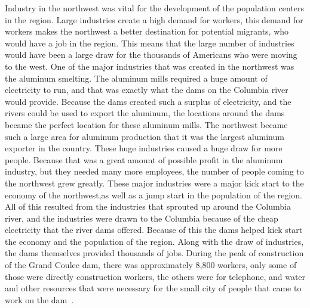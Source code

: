 \documentclass[12pt,twoside]{article}
\begin{document}
Industry in the northwest was vital for the development of the population centers in the region. Large industries create a high demand for workers, this demand for workers makes the northwest a better destination for potential migrants, who would have a job in the region. This means that the large number of industries would have been a large draw for the thousands of Americans who were moving to the west. One of the major industries that was created in the northwest was the aluminum smelting. The aluminum mills required a huge amount of electricity to run, and that was exactly what the dams on the Columbia river would provide. Because the dams created such a surplus of electricity, and the rivers could be used to export the aluminum, the locations around the dams became the perfect location for these aluminum mills. The northwest became such a large area for aluminum production that it was the largest aluminum exporter in the country. These huge industries caused a huge draw for more people. Because that was a great amount of possible profit in the aluminum industry, but they needed many more employees, the number of people coming to the northwest grew greatly. These major industries were a major kick start to the economy of the northwest,as well as a jump start in the population of the region. All of this resulted from the industries that sprouted up around the Columbia river, and the industries were drawn to the Columbia because of the cheap electricity that the river dams offered. Because of this the dams helped kick start the economy and the population of the region. Along with the draw of industries, the dams themselves provided thousands of jobs. During the peak of construction of the Grand Coulee dam, there was approximately 8,800 workers, only some of those were directly construction workers, the others were for telephone, and water and other resources that were necessary for the small city of people that came to work on the dam~\cite{MOTA}.
\par
\end{document}
